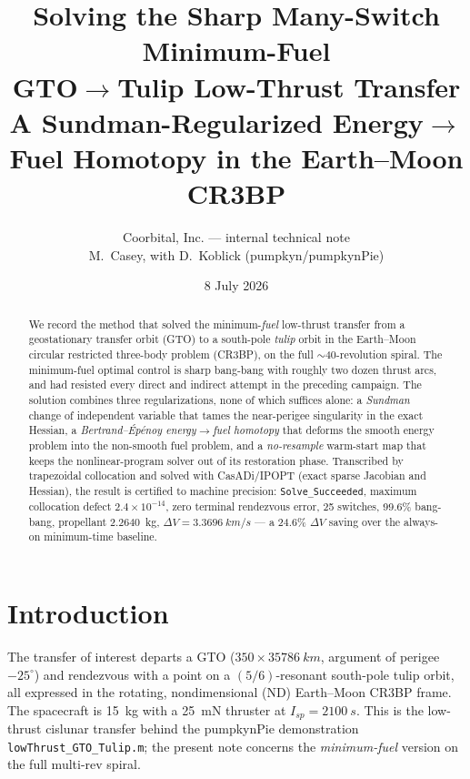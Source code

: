 \documentclass[11pt]{article}
\title{\bfseries Solving the Sharp Many-Switch Minimum-Fuel\\
GTO$\to$Tulip Low-Thrust Transfer\\[2pt]
\large A Sundman-Regularized Energy$\to$Fuel Homotopy in the Earth--Moon CR3BP}
\author{Coorbital, Inc. --- internal technical note\\
M.\ Casey, with D.\ Koblick (pumpkyn/pumpkynPie)}
\date{8 July 2026}
\newcommand{\code}[1]{\texttt{#1}}
\begin{document}
\sloppy  %
\maketitle

\begin{abstract}
\noindent
We record the method that solved the minimum-\emph{fuel} low-thrust transfer
from a geostationary transfer orbit (GTO) to a south-pole \emph{tulip} orbit in
the Earth--Moon circular restricted three-body problem (CR3BP), on the full
$\sim$40-revolution spiral. The minimum-fuel optimal control is sharp
bang-bang with roughly two dozen thrust arcs, and had resisted every direct and
indirect attempt in the preceding campaign. The solution combines three
regularizations, none of which suffices alone: a \emph{Sundman} change of
independent variable that tames the near-perigee singularity in the exact
Hessian, a \emph{Bertrand--\'Ep\'enoy energy$\to$fuel homotopy} that deforms the
smooth energy problem into the non-smooth fuel problem, and a \emph{no-resample}
warm-start map that keeps the nonlinear-program solver out of its restoration
phase. Transcribed by trapezoidal collocation and solved with CasADi/IPOPT
(exact sparse Jacobian and Hessian), the result is certified to machine
precision: \code{Solve\_Succeeded}, maximum collocation defect
$2.4\times10^{-14}$, zero terminal rendezvous error, 25 switches, 99.6\%
bang-bang, propellant \SI{2.2640}{kg}, $\Delta V = \SI{3.3696}{km/s}$ --- a
24.6\% $\Delta V$ saving over the always-on minimum-time baseline.
\end{abstract}

\section{Introduction}
The transfer of interest departs a GTO ($350\times\SI{35786}{km}$, argument of
perigee $-25^\circ$) and rendezvous with a point on a $(5/6)$-resonant
south-pole tulip orbit, all expressed in the rotating, nondimensional (ND)
Earth--Moon CR3BP frame. The spacecraft is \SI{15}{kg} with a \SI{25}{mN}
thruster at $I_{sp}=\SI{2100}{s}$. This is the low-thrust cislunar transfer
behind the pumpkynPie demonstration \code{lowThrust\_GTO\_Tulip.m}; the
present note concerns the \emph{minimum-fuel} version on the full multi-rev
spiral.
\end{document}
